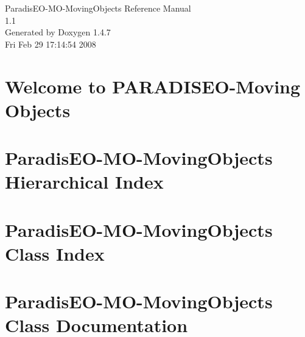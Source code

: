 \documentclass[a4paper]{book}
\begin{document}
\begin{titlepage}
\vspace*{7cm}
\begin{center}
{\Large Paradis\-EO-MO-Moving\-Objects Reference Manual\\[1ex]\large 1.1 }\\
\vspace*{1cm}
{\large Generated by Doxygen 1.4.7}\\
\vspace*{0.5cm}
{\small Fri Feb 29 17:14:54 2008}\\
\end{center}
\end{titlepage}
\clearemptydoublepage
{}
\tableofcontents
\clearemptydoublepage
{}
\chapter{Welcome to PARADISEO-Moving Objects }
\label{index}
\chapter{Paradis\-EO-MO-Moving\-Objects Hierarchical Index}

\chapter{Paradis\-EO-MO-Moving\-Objects Class Index}

\chapter{Paradis\-EO-MO-Moving\-Objects Class Documentation}




































\printindex
\end{document}
